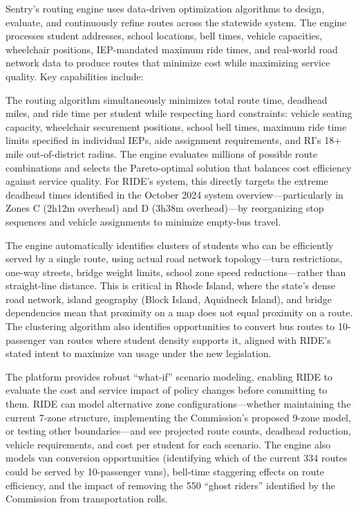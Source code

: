 Sentry's routing engine uses data-driven optimization algorithms to design, evaluate, and continuously refine routes across the statewide system. The engine processes student addresses, school locations, bell times, vehicle capacities, wheelchair positions, IEP-mandated maximum ride times, and real-world road network data to produce routes that minimize cost while maximizing service quality. Key capabilities include:

\begin{description}[style=nextline, leftmargin=0.5cm]
    \item[\faIcon{route} \textbf{Multi-Objective Optimization:}] The routing algorithm simultaneously minimizes total route time, deadhead miles, and ride time per student while respecting hard constraints: vehicle seating capacity, wheelchair securement positions, school bell times, maximum ride time limits specified in individual IEPs, aide assignment requirements, and RI's 18+ mile out-of-district radius. The engine evaluates millions of possible route combinations and selects the Pareto-optimal solution that balances cost efficiency against service quality. For RIDE's system, this directly targets the extreme deadhead times identified in the October 2024 system overview---particularly in Zones C (2h12m overhead) and D (3h38m overhead)---by reorganizing stop sequences and vehicle assignments to minimize empty-bus travel.

    \item[\faIcon{map-marked-alt} \textbf{Geographic Clustering:}] The engine automatically identifies clusters of students who can be efficiently served by a single route, using actual road network topology---turn restrictions, one-way streets, bridge weight limits, school zone speed reductions---rather than straight-line distance. This is critical in Rhode Island, where the state's dense road network, island geography (Block Island, Aquidneck Island), and bridge dependencies mean that proximity on a map does not equal proximity on a route. The clustering algorithm also identifies opportunities to convert bus routes to 10-passenger van routes where student density supports it, aligned with RIDE's stated intent to maximize van usage under the new legislation.

    \item[\faIcon{retweet} \textbf{Scenario Modeling:}] The platform provides robust ``what-if'' scenario modeling, enabling RIDE to evaluate the cost and service impact of policy changes before committing to them. RIDE can model alternative zone configurations---whether maintaining the current 7-zone structure, implementing the Commission's proposed 9-zone model, or testing other boundaries---and see projected route counts, deadhead reduction, vehicle requirements, and cost per student for each scenario. The engine also models van conversion opportunities (identifying which of the current 334 routes could be served by 10-passenger vans), bell-time staggering effects on route efficiency, and the impact of removing the 550 ``ghost riders'' identified by the Commission from transportation rolls.


\end{description}
